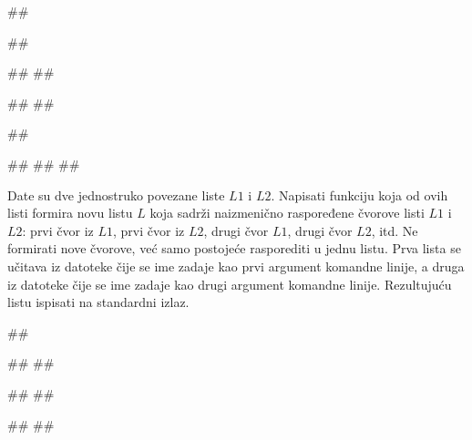 \begin{Exercise}[difficulty=1, label=4_06]
\begin{miditest}
\begin{test}{3}
##

##

##
##

#\naslovIzlaz#
#\izlaz{[5, 6, 11, 12, 14, 16]}#
\end{test}
\end{miditest}
\begin{miditest}
\begin{test}{4}
##

#\naslovIzlazZaGresku# 
## 
##
\end{test}
\end{miditest}

\end{Exercise}
\begin{Answer}[ref=4_06]
\end{Answer}

\begin{Exercise}[difficulty=1,label=4_07]
Date su dve jednostruko povezane liste $L1$ i $L2$. Napisati funkciju koja od 
ovih listi formira novu listu $L$ koja sadrži naizmenično raspoređene čvorove 
listi $L1$ i $L2$: prvi čvor iz $L1$, prvi čvor iz $L2$, drugi čvor $L1$,
drugi čvor $L2$, itd. Ne formirati nove čvorove, već samo postojeće rasporediti u jednu listu. Prva lista se učitava iz datoteke čije se ime zadaje kao prvi argument komandne linije, a druga iz datoteke čije se ime zadaje kao 
drugi argument komandne linije. Rezultujuću listu ispisati na standardni izlaz.\\

\begin{miditest}
\begin{test}{1}
##

##
##

##
##

#\naslovIzlaz#
##
\end{test}
\end{miditest}
\end{Exercise}

